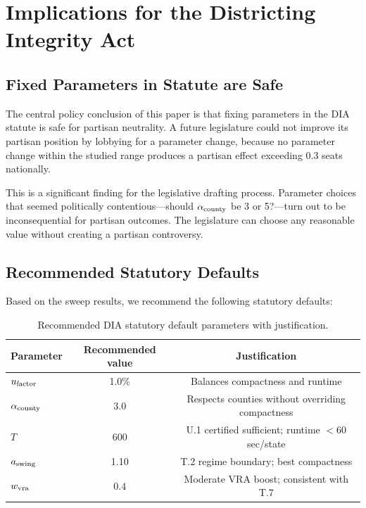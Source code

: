 \section{Implications for the Districting Integrity Act}
\label{sec:implications}

\subsection{Fixed Parameters in Statute are Safe}

The central policy conclusion of this paper is that fixing parameters in
the DIA statute is safe for partisan neutrality.
A future legislature could not improve its partisan position by lobbying
for a parameter change, because no parameter change within the studied
range produces a partisan effect exceeding 0.3 seats nationally.

This is a significant finding for the legislative drafting process.
Parameter choices that seemed politically contentious---should $\alpha_{\mathrm{county}}$
be 3 or 5?---turn out to be inconsequential for partisan outcomes.
The legislature can choose any reasonable value without creating a
partisan controversy.

\subsection{Recommended Statutory Defaults}

Based on the sweep results, we recommend the following statutory defaults:

\begin{table}[h]
\centering
\caption{Recommended DIA statutory default parameters with justification.}
\label{tab:recommended-defaults}
\begin{tabular}{lcc}
\toprule
Parameter & Recommended value & Justification \\
\midrule
$u_{\mathrm{factor}}$ & 1.0\% & Balances compactness and runtime \\
$\alpha_{\mathrm{county}}$ & 3.0 & Respects counties without overriding compactness \\
$T$ & 600 & U.1 certified sufficient; runtime $<$60 sec/state \\
$a_{\mathrm{swing}}$ & 1.10 & T.2 regime boundary; best compactness \\
$w_{\mathrm{vra}}$ & 0.4 & Moderate VRA boost; consistent with T.7 \\
\bottomrule
\end{tabular}
\end{table}

